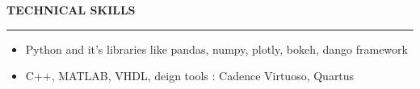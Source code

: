 \documentclass[10 pt]{article}%
\begin{document}
{{{{{{{{{{{%
\begin{flushleft}\bf{\Large{\textcolor{color2}{TECHNICAL SKILLS}}}\end{flushleft}
\vspace{-5pt}
\hrule
\vspace{1 pt}
\begin{itemize}[leftmargin=*]
	\setlength\itemsep{1.5pt}
	\setlength\parskip{1.5pt}
	\item Python and it's libraries like pandas, numpy, plotly, bokeh, dango framework
	\item C++, MATLAB, VHDL, deign tools : Cadence Virtuoso, Quartus
\end{itemize}

}}}}}}}}}}}
\end{document}
